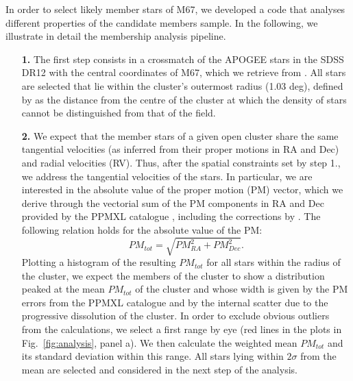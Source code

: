 \documentclass[a4paper,fleqn,usenatbib]{mnras}
\begin{document}
In order to select likely member stars of M67, we developed a code that analyses different properties of the candidate members sample.  In the following, we illustrate in detail the membership analysis pipeline.
\begin{itemize}
	\item [\textbf{1.}] The first step consists in a crossmatch of the APOGEE stars in the SDSS DR12 with the central coordinates of M67, which we retrieve 	from \citet{kharchenko2013}. All stars are selected that lie within the cluster's outermost radius (1.03 deg), defined by  \citet{kharchenko2013} as the distance from the centre of the cluster at which the density of stars cannot be distinguished from that of the field. 
	\item [\textbf{2.}] We expect that the member stars of a given open cluster share the same tangential velocities (as inferred from their proper motions in RA and Dec) and radial velocities (RV). Thus, after the spatial constraints set by step 1., we address the tangential velocities of the stars. In particular, we are interested in the absolute value of the proper motion (PM) vector, which we derive through the vectorial sum of the PM components in RA and Dec provided by the PPMXL catalogue  \citep{roeser2010}, including the corrections by \citet{vickers2016}. The following relation holds for the absolute value of the PM:
	\begin{equation}
		PM_{tot}=\sqrt{PM_{RA}^2+PM_{Dec}^2}.
		\label{eq:pm}
	\end{equation} 
	Plotting a histogram of the resulting $PM_{tot}$ for all stars within the radius of the cluster, we expect the members of the cluster to show a distribution peaked at the mean $PM_{tot}$ of the cluster and whose width is given by the PM errors from the PPMXL catalogue and by the internal scatter due to the progressive dissolution of the cluster. In order to exclude obvious outliers from the calculations, we select a first range by eye (red lines in the plots in Fig.~\ref{fig:analysis}, panel a). We then calculate the weighted mean $PM_{tot}$ and its standard deviation within this range. All stars lying within $2 \sigma$ from the mean are selected and considered in the next step of the analysis. 
	

\end{itemize}
\end{document}
